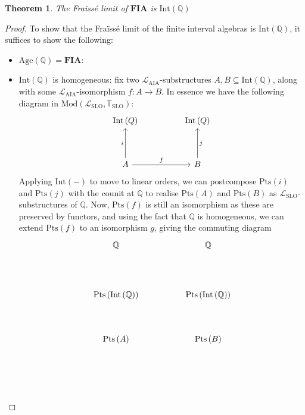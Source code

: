 \documentclass[11pt %
              ]{article}
\newcommand{\Q}{\mathbb{Q}}
\newcommand{\lang}{\mathcal{L}}
\newcommand{\theory}{\mathbb{T}}
\newcommand{\age}[1]{\text{Age}\left(#1\right)}
\newcommand{\finaia}{\textbf{FIA}}
\newcommand{\lslo}{\lang_\text{SLO}}
\newcommand{\tslo}{\theory_\text{SLO}}
\newcommand{\laia}{\lang_\text{AIA}}
\newcommand{\mods}[2]{\text{Mod}\left(#1,#2\right)}
\newcommand{\slos}{\mods{\lslo}{\tslo}}
\newcommand{\inter}[1][-]{\text{Int}\left(#1\right)}
\newcommand{\points}[1][-]{\text{Pts}\left(#1\right)}
\theoremstyle{plain}
\newtheorem{thm}{Theorem}%
\theoremstyle{definition}
\theoremstyle{remark}
\begin{document}
\begin{thm}
  The Fraïssé limit of $\finaia$ is $\inter[\Q]$
\end{thm}
\begin{proof}
  To show that the Fraïssé limit of the finite interval algebras is $\inter[\Q]$, it suffices to
  show the following:
  \begin{itemize}
    \item $\age{\Q} = \finaia$:
    \item $\inter[\Q]$ is homogeneous: fix two $\laia$-substructures $A,B \subseteq \inter[\Q]$,
      along with some $\laia$-isomorphism $f : A \to B$. In essence we have the following
      diagram in $\slos$:
      \[\begin{tikzcd}
        {\inter[Q]} && {\inter[Q]} \\
        \\
        A && B
        \arrow["f", from=3-1, to=3-3]
        \arrow["i", from=3-1, to=1-1]
        \arrow["j"', from=3-3, to=1-3]
      \end{tikzcd}\]
      Applying $\inter$ to move to linear orders, we can postcompose $\points[i]$ and $\points[j]$ with
      the counit at $\Q$ to realise $\points[A]$ and $\points[B]$ as $\lslo$-substructures of $\Q$.
      Now, $\points[f]$ is still an isomorphism as these are preserved by functors, and using the
      fact that $\Q$ is homogeneous, we can extend $\points[f]$ to an isomorphism $g$, giving the
      commuting diagram
      \[\begin{tikzcd}
        \Q && \Q \\
        {} \\
        {\points[\inter[\Q]]} && {\points[\inter[\Q]]} \\
        \\
        {\points[A]} && {\points[B]} \\
        \\
        \\

\end{tikzcd}\]
\end{itemize}
\end{proof}
\end{document}
